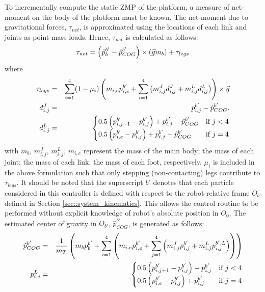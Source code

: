 		To incrementally compute the static ZMP of the platform, a measure of net-moment on the body of the platform must be known. The net-moment due to gravitational forces, $\tau_{net}$, is approximated using the locations of each link and joints as point-mass loads. Hence, $\tau_{net}$ is calculated as follows:
			\begin{equation}
				\tau_{net} 	=  \left(\bar{p}_{b}^{b'}-\hat{p}_{COG}^{b'} \right) \times \left(\vec{g} m_{b}\right)	+ \tau_{legs}
				\label{eq::net_moment}
			\end{equation}
		where
			\begin{eqnarray*}
					\tau_{legs}		& = & \sum_{i=1}^{4} (1-\mu_{i}) \left( m_{i,e} p_{i,e}^{b'} + \sum_{i=1}^{4}   \left( m_{i,j}^{J} d_{i,j}^{J} + m_{i,j}^{L} d_{i,j}^{L} \right) \right) \times \vec{g} \nonumber \\
					d_{i,j}^{J} 	& = & {{p}_{i,j}^{b'}-\hat{p}_{COG}^{b'}.} \nonumber \\														
					d_{i,j}^{L} 	& = &
					\begin{cases}
					{ 0.5  \left({p}_{i,j+1}^{b'}-{p}_{i,j}^{b'}\right) + {p}_{i,j}^{b'} - \hat{p}_{COG}^{b'}} 	&\text{if } j < 4 \\
					{ 0.5  \left({p}_{i,e}^{b'}-{p}_{i,j}^{b'}\right) + {p}_{i,j}^{b'} - \hat{p}_{COG}^{b'}} 		&\text{if } j = 4
					\end{cases} \nonumber
				\label{eq::Levers}
			\end{eqnarray*}
		with $m_{b}$, $m_{i,j}^{J}$, $m_{i,j}^{L}$, $m_{i,e}$ represent the mass of the main body; the mass of each joint; the mass of each link; the mass of each foot, respectively. $\mu_{i}$ is included in the above formulation such that only stepping (non-contacting) legs contribute to  $\tau_{legs}$. It should be noted that the superscript ${b'}$ denotes that each particle considered in this controller is defined with respect to the robot-relative frame $O_{b'}$ defined in Section \ref{sec::system_kinematics}. This allows the control routine to be performed without explicit knowledge of robot's absolute position in $O_{0}$. The estimated center of gravity in $O_{b'}$, $\hat{p}_{COG}^{b'}$, is generated as follows:
			\begin{eqnarray*}
				\hat{p}_{COG}^{b'} 	& = & \frac{1}{m_{T}}\left( m_{b}p_{b}^{b'} + \sum_{i=1}^{4} \left(m_{i,e}{p}_{i,e}^{b'} + \sum_{j=1}^{4} \left(  m_{i,j}^{J}{p}_{i,j}^{b'} +  m_{i,j}^{L}{p}_{i,j}^{b',L} \right) \right)\right) 	\nonumber \\
				{p}_{i,j}^{L} 	& = & 
					\begin{cases}
					{ 0.5  \left({p}_{i,j+1}^{b'}-{p}_{i,j}^{b'}\right) + {p}_{i,j}^{b'} } 	&\text{if } j < 4 \\
					{ 0.5  \left({p}_{i,e}^{b'}-{p}_{i,j}^{b'}\right) + {p}_{i,j}^{b'} } 		&\text{if } j = 4
					\end{cases} \nonumber
				\label{eq::cog_estimate}
			\end{eqnarray*}
